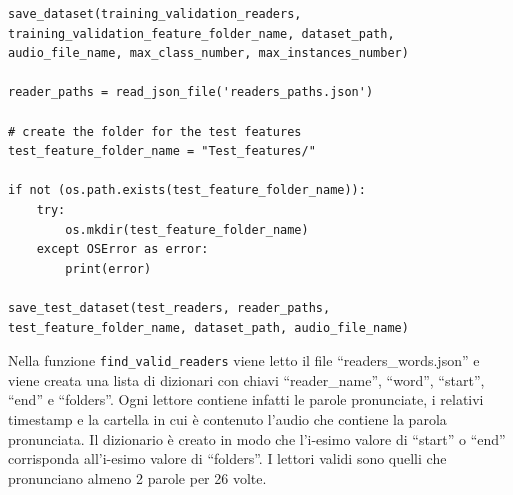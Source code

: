 \documentclass[12pt,a4paper,titlepage]{article}
\begin{document}
\begin{lstlisting}[language=iPython,firstnumber=262, caption=preprocessing.py, label=preprocessing,captionpos=b]
save_dataset(training_validation_readers, training_validation_feature_folder_name, dataset_path, audio_file_name, max_class_number, max_instances_number)

reader_paths = read_json_file('readers_paths.json')

# create the folder for the test features
test_feature_folder_name = "Test_features/"

if not (os.path.exists(test_feature_folder_name)):
    try:
        os.mkdir(test_feature_folder_name)
    except OSError as error:
        print(error)   

save_test_dataset(test_readers, reader_paths, test_feature_folder_name, dataset_path, audio_file_name)
\end{lstlisting}

Nella funzione \texttt{find\_valid\_readers} viene letto il file ``readers\_words.json'' e viene creata una lista di dizionari con chiavi ``reader\_name'', ``word'', ``start'', ``end'' e ``folders''. Ogni lettore contiene infatti le parole pronunciate, i relativi timestamp e la cartella in cui è contenuto l'audio che contiene la parola pronunciata. Il dizionario è creato in modo che l'i-esimo valore di ``start'' o ``end'' corrisponda all'i-esimo valore di ``folders''. I lettori validi sono quelli che pronunciano almeno 2 parole per 26 volte.
\end{document}
